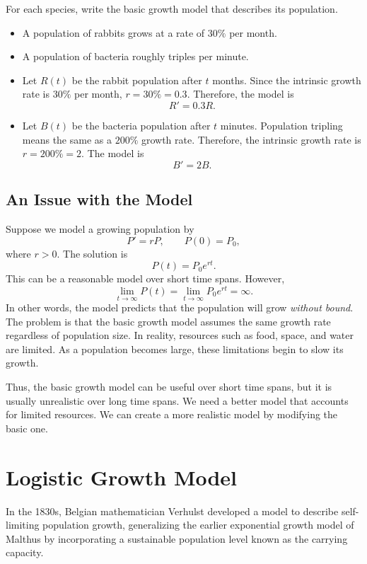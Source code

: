 \documentclass[09pt,letterpaper]{article}
\begin{document}
\begin{example}[1]{
For each species, write the basic growth model that describes its population.
\begin{itemize}
    \item A population of rabbits grows at a rate of $30\%$ per
    month.

    \item A population of bacteria roughly triples per
    minute.
\end{itemize}
}

\begin{itemize}

\item Let $R(t)$ be the rabbit population after $t$ months. Since the intrinsic
growth rate is $30\%$ per month, $r=30\%=0.3$.
Therefore, the model is
\[
\boxed{
R'=0.3R.
}
\]

\item Let $B(t)$ be the bacteria population after $t$ minutes. Population tripling means the same as a $200\%$ growth rate. Therefore, the intrinsic growth rate is $r=200\%=2$. The model is
\[
\boxed{
B'=2B.
}
\]
\end{itemize}
\end{example}


\subsection{An Issue with the Model}

Suppose we model a growing population by
\[
P'=rP, \qquad P(0)=P_0,
\]
where $r>0$. The solution is
$$
P(t)=P_0e^{rt}.
$$
This can be a reasonable model over short time spans. However, 
\[
\lim_{t\to\infty}P(t)
=
\lim_{t\to\infty}P_0e^{rt}
=
\infty.
\]
In other words, the model predicts that the population will grow
\textit{without bound}. The problem is that the basic growth model assumes the same growth rate regardless of population size. In reality, resources such as food, space,
and water are limited. As a population becomes large, these limitations
begin to slow its growth.

Thus, the basic growth model can be useful over short time spans, but it is
usually unrealistic over long time spans. We need a better model that
accounts for limited resources. We can create a more realistic model by modifying the basic one.


\section{Logistic Growth Model}
In the 1830s, Belgian mathematician Verhulst developed a model to describe
self-limiting population growth, generalizing the earlier exponential growth
model of Malthus by incorporating a sustainable population level known as the
carrying capacity.
\end{document}
